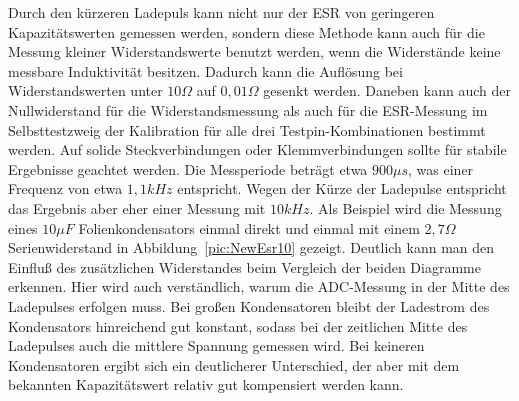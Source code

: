 Durch den kürzeren Ladepuls kann nicht nur der ESR von geringeren Kapazitätswerten gemessen werden, sondern
diese Methode kann auch für die Messung kleiner Widerstandswerte benutzt werden, wenn die Widerstände
keine messbare Induktivität besitzen. Dadurch kann die Auflösung bei Widerstandswerten unter \(10\Omega\) auf 
\(0,01\Omega\) gesenkt werden. Daneben kann auch der Nullwiderstand für die Widerstandsmessung als auch
für die ESR-Messung im Selbsttestzweig der Kalibration für alle drei Testpin-Kombinationen bestimmt werden.
Auf solide Steckverbindungen oder Klemmverbindungen sollte für stabile Ergebnisse geachtet werden.
Die Messperiode beträgt etwa \(900\mu s\), was einer Frequenz von etwa \(1,1kHz\) entspricht.
Wegen der Kürze der Ladepulse entspricht das Ergebnis aber eher einer Messung mit \(10kHz\).
Als Beispiel wird die Messung eines \(10\mu F\) Folienkondensators einmal direkt und einmal mit einem
\(2,7\Omega\) Serienwiderstand in Abbildung~\ref{pic:NewEsr10} gezeigt.
Deutlich kann man den Einfluß des zusätzlichen Widerstandes beim Vergleich der beiden Diagramme erkennen.
Hier wird auch verständlich, warum die ADC-Messung in der Mitte des Ladepulses erfolgen muss.
Bei großen Kondensatoren bleibt der Ladestrom des Kondensators hinreichend gut konstant,
sodass bei der zeitlichen Mitte des Ladepulses auch die mittlere Spannung gemessen wird.
Bei keineren Kondensatoren ergibt sich ein deutlicherer Unterschied, der aber mit dem
bekannten Kapazitätswert relativ gut kompensiert werden kann.

